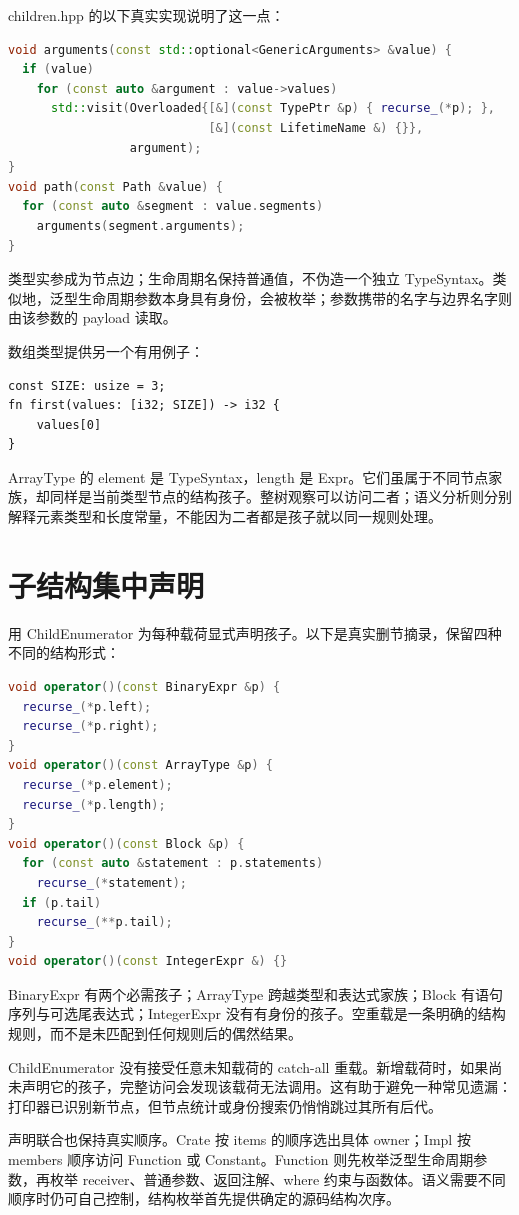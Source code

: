 children.hpp 的以下真实实现说明了这一点：
\begin{lstlisting}[language=C++]
void arguments(const std::optional<GenericArguments> &value) {
  if (value)
    for (const auto &argument : value->values)
      std::visit(Overloaded{[&](const TypePtr &p) { recurse_(*p); },
                            [&](const LifetimeName &) {}},
                 argument);
}
void path(const Path &value) {
  for (const auto &segment : value.segments)
    arguments(segment.arguments);
}
\end{lstlisting}
类型实参成为节点边；生命周期名保持普通值，不伪造一个独立 TypeSyntax。类似地，泛型生命周期参数本身具有身份，会被枚举；参数携带的名字与边界名字则由该参数的 payload 读取。

数组类型提供另一个有用例子：
\begin{lstlisting}[language=Rustless]
const SIZE: usize = 3;
fn first(values: [i32; SIZE]) -> i32 {
    values[0]
}
\end{lstlisting}
ArrayType 的 element 是 TypeSyntax，length 是 Expr。它们虽属于不同节点家族，却同样是当前类型节点的结构孩子。整树观察可以访问二者；语义分析则分别解释元素类型和长度常量，不能因为二者都是孩子就以同一规则处理。

\section{子结构集中声明}
 用 ChildEnumerator 为每种载荷显式声明孩子。以下是真实删节摘录，保留四种不同的结构形式：
\begin{lstlisting}[language=C++]
void operator()(const BinaryExpr &p) {
  recurse_(*p.left);
  recurse_(*p.right);
}
void operator()(const ArrayType &p) {
  recurse_(*p.element);
  recurse_(*p.length);
}
void operator()(const Block &p) {
  for (const auto &statement : p.statements)
    recurse_(*statement);
  if (p.tail)
    recurse_(**p.tail);
}
void operator()(const IntegerExpr &) {}
\end{lstlisting}
BinaryExpr 有两个必需孩子；ArrayType 跨越类型和表达式家族；Block 有语句序列与可选尾表达式；IntegerExpr 没有有身份的孩子。空重载是一条明确的结构规则，而不是未匹配到任何规则后的偶然结果。

ChildEnumerator 没有接受任意未知载荷的 catch-all 重载。新增载荷时，如果尚未声明它的孩子，完整访问会发现该载荷无法调用。这有助于避免一种常见遗漏：打印器已识别新节点，但节点统计或身份搜索仍悄悄跳过其所有后代。

声明联合也保持真实顺序。Crate 按 items 的顺序选出具体 owner；Impl 按 members 顺序访问 Function 或 Constant。Function 则先枚举泛型生命周期参数，再枚举 receiver、普通参数、返回注解、where 约束与函数体。语义需要不同顺序时仍可自己控制，结构枚举首先提供确定的源码结构次序。

